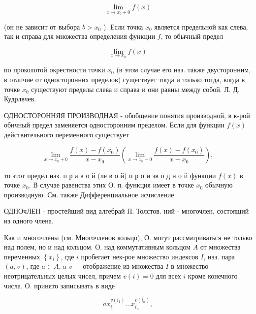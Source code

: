 \documentclass[10pt]{article}
\begin{document}
\[

\lim _{x \rightarrow x_{0}+0} f(x)

\]



(он не зависит от выбора $b>x_{0}$ ). Если точка $x_{0}$ является предельной как слева, так и справа для множества определения функции $f$, то обычный предел



\[

\lim _{x \rightarrow x_{0}} f(x)

\]



по проколотой окрестности точки $x_{0}$ (в этом случае его наз. также двусторонним, в отличие от односторонних пределов) существует тогда и только тогда, когда в точке $x_{0}$ существуют пределы слева и справа и они равны между собой. Л. Д. Кудрлвчев.



ОДНОСТОРОННЯЯ ПРОИЗВОДНАЯ - обобщение понятия производной, в к-рой обнчный предел заменяется односторонним пределом. Если для функции $f(x)$ действительного переменного существует



\[

\lim _{x \rightarrow x_{0}+0} \frac{f(x)-f\left(x_{0}\right)}{x-x_{0}}\left(\lim _{x \rightarrow x_{0}-0} \frac{f(x)-f\left(x_{0}\right)}{x-x_{0}}\right),

\]



то этот предел наз. п р а в о й (ле в о й) п р о и зв о д н о й функции $f(x)$ в точке $x_{0}$. В случае равенства этих О. п. функция имеет в точке $x_{0}$ обычную производную. См. также Дифференциальное исчисление.



ОДНОчЛЕН - простейший вид алгебрай П. Толстов. ний - многочлен, состоящий из одного члена.



Как и многочлены (см. Многочленов кольцо), О. могут рассматриваться не только над полем, но и над кольцом. О. над коммутативным кольцом $A$ от множества переменных $\left\{x_{i}\right\}$, где $i$ пробегает нек-рое множество индексов $I$, наз. пара $(a, v)$, где $a \in A$, a $v-$ отображение из множества $I$ в множество неотрицательных целых чисел, причем $v(i)=0$ для всех $i$ кроме конечного числа. О. принято записывать в виде



\[

a x_{i_{1}}^{v\left(i_{1}\right)} \ldots x_{i_{n}}^{v\left(i_{n}\right)},

\]
\end{document}
